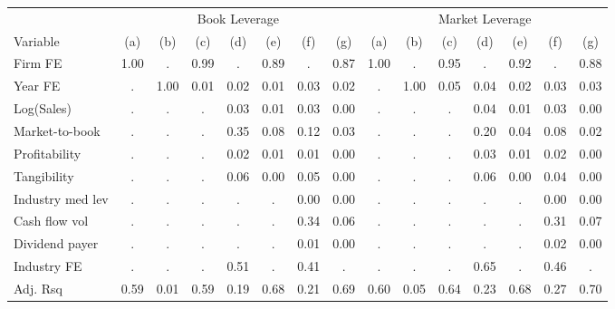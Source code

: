 \begin{tabular}{l c c c c c c c c c c c c c c}
\toprule
& \multicolumn{7}{c}{Book Leverage} & \multicolumn{7}{c}{Market Leverage} \\
\cmidrule(lr){2-8} \cmidrule(lr){9-15}
Variable & (a) & (b) & (c) & (d) & (e) & (f) & (g) & (a) & (b) & (c) & (d) & (e) & (f) & (g) \\
\midrule
Firm FE&1.00&.&0.99&.&0.89&.&0.87&1.00&.&0.95&.&0.92&.&0.88\\
Year FE&.&1.00&0.01&0.02&0.01&0.03&0.02&.&1.00&0.05&0.04&0.02&0.03&0.03\\
Log(Sales)&.&.&.&0.03&0.01&0.03&0.00&.&.&.&0.04&0.01&0.03&0.00\\
Market-to-book&.&.&.&0.35&0.08&0.12&0.03&.&.&.&0.20&0.04&0.08&0.02\\
Profitability&.&.&.&0.02&0.01&0.01&0.00&.&.&.&0.03&0.01&0.02&0.00\\
Tangibility&.&.&.&0.06&0.00&0.05&0.00&.&.&.&0.06&0.00&0.04&0.00\\
Industry med lev&.&.&.&.&.&0.00&0.00&.&.&.&.&.&0.00&0.00\\
Cash flow vol&.&.&.&.&.&0.34&0.06&.&.&.&.&.&0.31&0.07\\
Dividend payer&.&.&.&.&.&0.01&0.00&.&.&.&.&.&0.02&0.00\\
Industry FE&.&.&.&0.51&.&0.41&.&.&.&.&0.65&.&0.46&.\\
Adj. Rsq&0.59&0.01&0.59&0.19&0.68&0.21&0.69&0.60&0.05&0.64&0.23&0.68&0.27&0.70\\
\bottomrule
\end{tabular}
